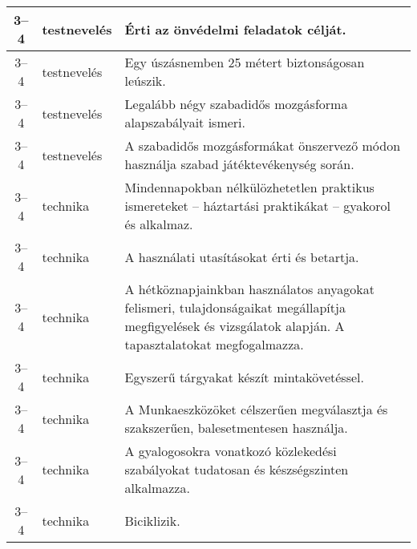\begin{small}
\begin{longtable}{c | p{2cm} |  p{11cm} }
              3--4 & testnevelés & Érti az önvédelmi feladatok célját. \\ \hline
              3--4 & testnevelés & Egy úszásnemben 25 métert biztonságosan leúszik. \\ \hline
              3--4 & testnevelés & Legalább négy szabadidős mozgásforma alapszabályait ismeri. \\ \hline
              3--4 & testnevelés & A szabadidős mozgásformákat önszervező módon használja szabad játéktevékenység során. \\ \hline
              3--4 & technika & Mindennapokban nélkülözhetetlen praktikus ismereteket – háztartási praktikákat – gyakorol és alkalmaz. \\ \hline
              3--4 & technika & A használati utasításokat érti és betartja. \\ \hline
              3--4 & technika & A hétköznapjainkban használatos anyagokat felismeri, tulajdonságaikat megállapítja megfigyelések és vizsgálatok alapján. A tapasztalatokat megfogalmazza. \\ \hline
              3--4 & technika & Egyszerű tárgyakat készít mintakövetéssel. \\ \hline
              3--4 & technika & A Munkaeszközöket célszerűen megválasztja és szakszerűen, balesetmentesen használja. \\ \hline
              3--4 & technika & A gyalogosokra vonatkozó közlekedési szabályokat tudatosan és készségszinten alkalmazza. \\ \hline
              3--4 & technika & Biciklizik. \\ \hline
      \end{longtable}
\end{small}


